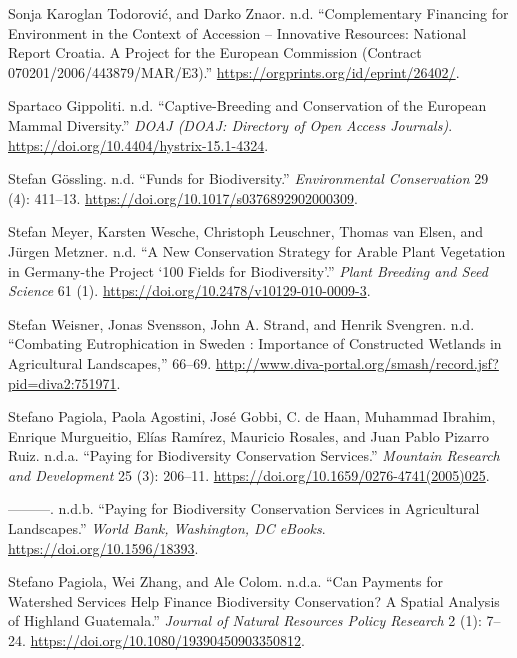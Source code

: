 \begin{CSLReferences}{1}{0}
Sonja Karoglan Todorović, and Darko Znaor. n.d. {``Complementary
Financing for Environment in the Context of Accession -- Innovative
Resources: National Report Croatia. A Project for the European
Commission (Contract 070201/2006/443879/MAR/E3).''}
\url{https://orgprints.org/id/eprint/26402/}.

Spartaco Gippoliti. n.d. {``Captive-Breeding and Conservation of the
European Mammal Diversity.''} \emph{DOAJ (DOAJ: Directory of Open Access
Journals)}. \url{https://doi.org/10.4404/hystrix-15.1-4324}.

Stefan Gössling. n.d. {``Funds for Biodiversity.''} \emph{Environmental
Conservation} 29 (4): 411--13.
\url{https://doi.org/10.1017/s0376892902000309}.

Stefan Meyer, Karsten Wesche, Christoph Leuschner, Thomas van Elsen, and
Jürgen Metzner. n.d. {``A New Conservation Strategy for Arable Plant
Vegetation in Germany-the Project {`100 Fields for Biodiversity'}.''}
\emph{Plant Breeding and Seed Science} 61 (1).
\url{https://doi.org/10.2478/v10129-010-0009-3}.

Stefan Weisner, Jonas Svensson, John A. Strand, and Henrik Svengren.
n.d. {``Combating Eutrophication in Sweden : Importance of Constructed
Wetlands in Agricultural Landscapes,''} 66--69.
\url{http://www.diva-portal.org/smash/record.jsf?pid=diva2:751971}.

Stefano Pagiola, Paola Agostini, José Gobbi, C. de Haan, Muhammad
Ibrahim, Enrique Murgueitio, Elías Ramírez, Mauricio Rosales, and Juan
Pablo Pizarro Ruiz. n.d.a. {``Paying for Biodiversity Conservation
Services.''} \emph{Mountain Research and Development} 25 (3): 206--11.
\url{https://doi.org/10.1659/0276-4741(2005)025}.

---------. n.d.b. {``Paying for Biodiversity Conservation Services in
Agricultural Landscapes.''} \emph{World Bank, Washington, DC eBooks}.
\url{https://doi.org/10.1596/18393}.

Stefano Pagiola, Wei Zhang, and Ale Colom. n.d.a. {``Can Payments for
Watershed Services Help Finance Biodiversity Conservation? A Spatial
Analysis of Highland Guatemala.''} \emph{Journal of Natural Resources
Policy Research} 2 (1): 7--24.
\url{https://doi.org/10.1080/19390450903350812}.


\end{CSLReferences}
